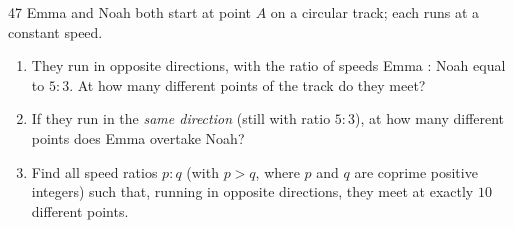 \begin{probbox}{47}{}
Emma and Noah both start at point $A$ on a circular track; each runs at a constant speed.
\begin{enumerate}[label=\alph*),leftmargin=1.6em,itemsep=1pt]
\item They run in opposite directions, with the ratio of speeds Emma : Noah equal to $5:3$. At how many different points of the track do they meet?
\item If they run in the \emph{same direction} (still with ratio $5:3$), at how many different points does Emma overtake Noah?
\item Find all speed ratios $p:q$ (with $p>q$, where $p$ and $q$ are coprime positive integers) such that, running in opposite directions, they meet at exactly $10$ different points.
\end{enumerate}
\end{probbox}
